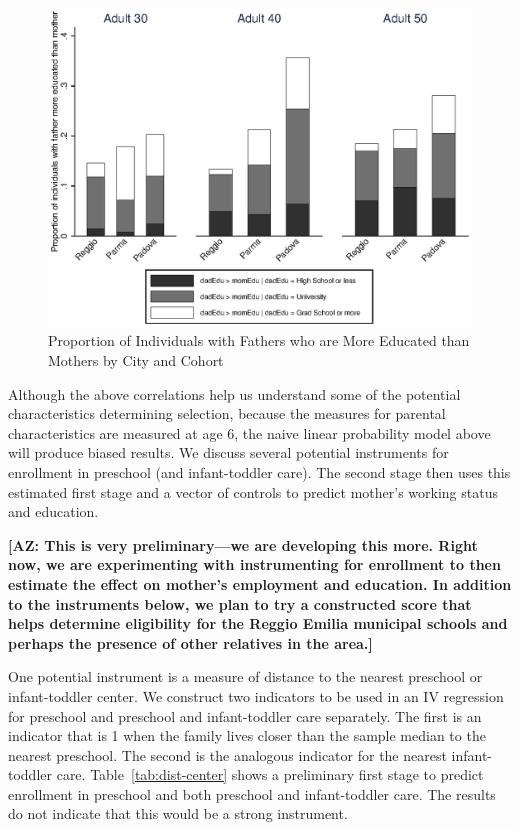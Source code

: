 \begin{figure}[!htb]
	\begin{minipage}{.9\textwidth}
	\centering
	\includegraphics[scale=1]{../../Output/image/bar_parentsEduCompare}
	\caption{Proportion of Individuals with Fathers who are More Educated than Mothers by City and Cohort}
	\label{fig:parentsEdu}
	\end{minipage}
\end{figure}

Although the above correlations help us understand some of the potential characteristics determining selection, because the measures for parental characteristics are measured at age 6, the naive linear probability model above will produce biased results. We discuss several potential instruments for enrollment in preschool (and infant-toddler care). The second stage then uses this estimated first stage and a vector of controls to predict mother's working status and education.

\textbf{[AZ: This is very preliminary---we are developing this more. Right now, we are experimenting with instrumenting for enrollment to then estimate the effect on mother's employment and education. In addition to the instruments below, we plan to try a constructed score that helps determine eligibility for the Reggio Emilia municipal schools and perhaps the presence of other relatives in the area.]}

One potential instrument is a measure of distance to the nearest preschool or infant-toddler center. We construct two indicators to be used in an IV regression for preschool and preschool and infant-toddler care separately. The first is an indicator that is 1 when the family lives closer than the sample median to the nearest preschool. The second is the analogous indicator for the nearest infant-toddler care. Table~\ref{tab:dist-center} shows a preliminary first stage to predict enrollment in preschool and both preschool and infant-toddler care. The results do not indicate that this would be a strong instrument.

